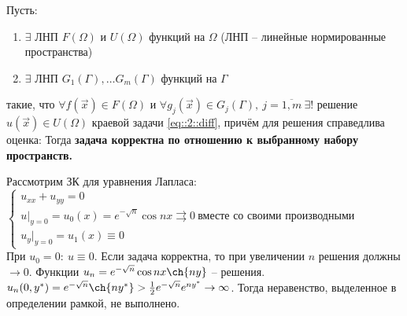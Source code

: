 \begin{definition}
Пусть:
\begin{enumerate}[noitemsep]
\item $\exists$ ЛНП $F(\Omega)$ и $U(\Omega)$ функций на $\Omega$ (ЛНП -- линейные нормированные пространства) 
\item $\exists$ ЛНП $G_1(\Gamma),\dots G_m(\Gamma)$ функций на $\Gamma$
\end{enumerate}
такие, что $\forall f(\vec{x}) \in F(\Omega) \text{ и } \forall g_j(\vec{x}) \in G_j(\Gamma),\ j=\overline{1,m}\ \exists!$ решение $u(\vec{x}) \in U(\Omega)$ краевой задачи \eqref{eq::2::diff}, причём для решения справедлива оценка:  Тогда {\bf задача корректна по отношению к выбранному набору пространств.}
\end{definition}
\begin{example}[Адамара]
Рассмотрим ЗК для уравнения Лапласа:\\
$\begin{cases} u_{xx}+u_{yy} = 0 \\
u|_{y=0} = u_0(x) = e^{-\sqrt{n}}\cos{nx} \rightrightarrows 0\ \text{вместе со своими производными} \\
u_y|_{y=0} = u_1(x) \equiv 0
\end{cases}$\\
При $u_0 = 0:\ u\equiv 0$. Если задача корректна, то при увеличении $n$ решения должны $\rightarrow 0$. Функции $u_n=e^{-\sqrt{n}}\cos{nx}\ch{ny}$ -- решения.\\$u_n(0, y^*) = e^{-\sqrt{n}}\ch{ny^*} > \frac1{2}e^{-\sqrt{n}}e^{ny^*} \rightarrow \infty$. Тогда неравенство, выделенное в определении рамкой, не выполнено.
\end{example}




